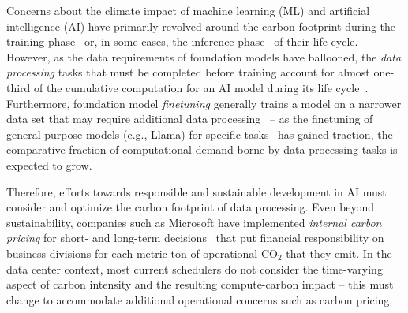 Concerns about the climate impact of machine learning (ML) and artificial intelligence (AI) have primarily revolved around the carbon footprint during the training phase~\cite{Hanafy:23:CarbonScaler, Wiesner:2021:WaitAwhile} or, in some cases, the inference phase~\cite{Baolin:2023:Clover} of their life cycle. 
However, as the data requirements of foundation models have ballooned, the \textit{data processing} tasks that must be completed before training %
account for almost one-third of the cumulative computation for an AI model during its life cycle~\cite{WU:2022:SustainableAI}. 
Furthermore, foundation model \textit{finetuning} generally trains a model on a narrower data set that may require additional data processing~\cite{Mosbach:21:FinetuningBERT} -- as the finetuning of general purpose models (e.g., Llama) for specific tasks~\cite{Liu:24:TaskLLMFinetuning, Lin:24:DataEfficientFinetuning} has gained traction, the comparative fraction of computational demand borne by data processing tasks is expected to grow.

Therefore, efforts towards responsible and sustainable development in AI must consider and optimize the carbon footprint of data processing. 
Even beyond sustainability, companies such as Microsoft have implemented \textit{internal carbon pricing} for short- and long-term decisions~\cite{Microsoft:19, McKinsey:21} that put financial responsibility on business divisions for each metric ton of operational CO$_2$ that they emit.  In the data center context, most current schedulers do not consider the time-varying aspect of carbon intensity and the resulting compute-carbon impact -- this must change to accommodate additional operational concerns such as carbon pricing. 



